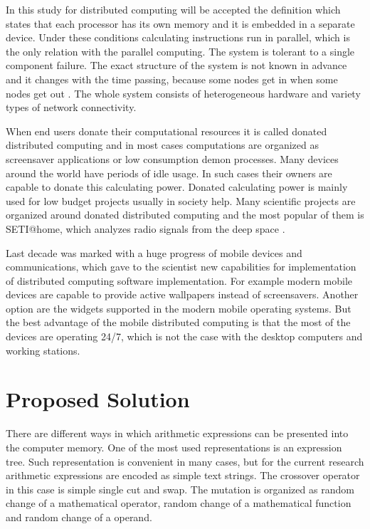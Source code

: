 \documentclass[graybox]{svmult}
\begin{document}
In this study for distributed computing will be accepted the definition which states that each processor has its own memory and it is embedded in a separate device. Under these conditions calculating instructions run in parallel, which is the only relation with the parallel computing. The system is tolerant to a single component failure. The exact structure of the system is not known in advance and it changes with the time passing, because some nodes get in when some nodes get out \cite{balabanov02}. The whole system consists of heterogeneous hardware and variety types of network connectivity. 

When end users donate their computational resources it is called donated distributed computing and in most cases computations are organized as screensaver applications or low consumption demon processes. Many devices around the world have periods of idle usage. In such cases their owners are capable to donate this calculating power. Donated calculating power is mainly used for low budget projects usually in society help. Many scientific projects are organized around donated distributed computing and the most popular of them is SETI@home, which analyzes radio signals from the deep space \cite {godfrey01}. 

Last decade was marked with a huge progress of mobile devices and communications, which gave to the scientist new capabilities for implementation of distributed computing software implementation. For example modern mobile devices are capable to provide active wallpapers instead of screensavers. Another option are the widgets supported in the modern mobile operating systems. But the best advantage of the mobile distributed computing is that the most of the devices are operating 24/7, which is not the case with the desktop computers and working stations. 

\section{Proposed Solution} \label{Proposed Solution}

There are different ways in which arithmetic expressions can be presented into the computer memory. One of the most used representations is an expression tree. Such representation is convenient in many cases, but for the current research arithmetic expressions are encoded as simple text strings. The crossover operator in this case is simple single cut and swap. The mutation is organized as random change of a mathematical operator, random change of a mathematical function and random change of a operand. 
\end{document}
